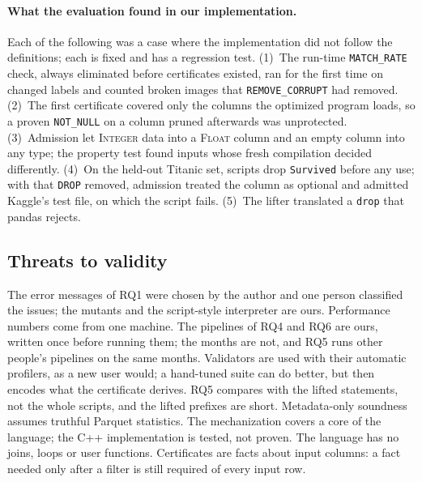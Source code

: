 \paragraph{What the evaluation found in our implementation.} Each of the following was a case where
the implementation did not follow the definitions; each is fixed and has a regression test. (1)~The
run-time \texttt{MATCH\_RATE} check, always eliminated before certificates existed, ran for the first
time on changed labels and counted broken images that \texttt{REMOVE\_CORRUPT} had removed. (2)~The
first certificate covered only the columns the optimized program loads, so a proven \texttt{NOT\_NULL}
on a column pruned afterwards was unprotected. (3)~Admission let \textsc{Integer} data into a
\textsc{Float} column and an empty column into any type; the property test found inputs whose fresh
compilation decided differently. (4)~On the held-out Titanic set, scripts drop \texttt{Survived} before
any use; with that \texttt{DROP} removed, admission treated the column as optional and admitted
Kaggle's test file, on which the script fails. (5)~The lifter translated a \texttt{drop} that pandas
rejects.

\subsection{Threats to validity}

The error messages of RQ1 were chosen by the author and one person classified the issues; the
mutants and the script-style interpreter are ours. Performance numbers come from one machine. The
pipelines of RQ4 and RQ6 are ours, written once before running them; the months are not, and RQ5 runs
other people's pipelines on the same months. Validators are
used with their automatic profilers, as a new user would; a hand-tuned suite can do better, but then
encodes what the certificate derives. RQ5 compares with the lifted statements, not the whole scripts,
and the lifted prefixes are short. Metadata-only soundness assumes truthful Parquet statistics. The
mechanization covers a core of the language; the C++ implementation is tested, not proven. The language has
no joins, loops or user functions. Certificates are facts about input columns: a fact needed only
after a filter is still required of every input row.
